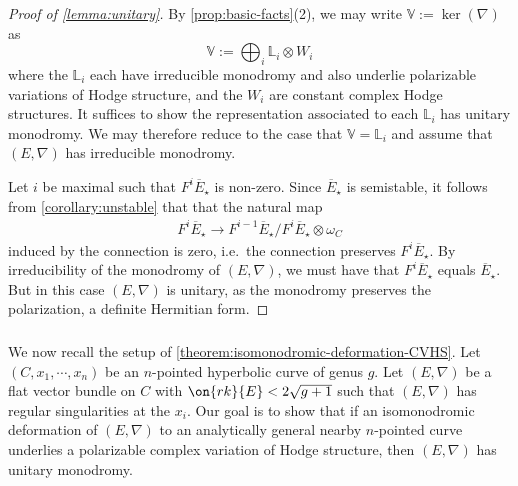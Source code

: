 \begin{proof}[Proof of \autoref{lemma:unitary}]
	By \autoref{prop:basic-facts}(2), we may write
	$\mathbb{V}:=\ker(\nabla)$ as $$\mathbb{V}:=\bigoplus_i
	\mathbb{L}_i\otimes W_i$$ where the $\mathbb{L}_i$ each have irreducible
	monodromy and also underlie polarizable variations of Hodge structure,
	and the $W_i$ are constant complex Hodge structures.
	It suffices to show the representation associated to each $\mathbb L_i$ has unitary monodromy.
	We may therefore reduce to the case that $\mathbb{V} = \mathbb L_i$ and assume
	that $(E,\nabla)$ has irreducible monodromy.


Let $i$ be maximal such that $F^i\overline{E}_\star$ is non-zero.
Since $\overline{E}_\star$ is semistable, it follows from
\autoref{corollary:unstable} that
that the natural map
\begin{align*}
	F^i\overline{E}_\star \to
	F^{i-1}\overline{E}_\star/F^i\overline{E}_\star\otimes \omega_C
\end{align*}
induced by the connection is zero, i.e.~the connection preserves
$F^i\overline{E}_\star$. By irreducibility
of the monodromy of $(E, \nabla)$, we must have that $F^i\overline{E}_\star$ equals
$\overline{E}_\star.$
But in this case $({E}, \nabla)$ is unitary, as the monodromy preserves the polarization, a definite Hermitian form.
\end{proof}


\subsubsection{}
We now recall  the setup of
\autoref{theorem:isomonodromic-deformation-CVHS}. Let
$(C, x_1, \cdots, x_n)$
be an $n$-pointed
hyperbolic curve
of genus $g$.
Let $({E}, \nabla)$ be a flat vector bundle on
$C$ with $\on{rk}{E}<2\sqrt{g+1}$ such that $(E,\nabla)$ has regular singularities at the $x_i$. Our goal is to show that if an isomonodromic
deformation of ${(E, \nabla)}$ to an analytically general nearby $n$-pointed curve underlies a polarizable complex variation of Hodge structure, then $({E},\nabla)$ has unitary monodromy.

